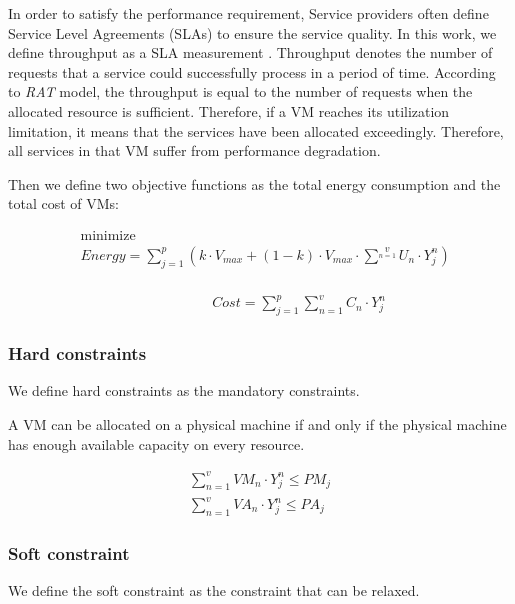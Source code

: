 In order to satisfy the performance requirement, Service providers often define Service Level Agreements (SLAs) to ensure the service quality. In this work, we define throughput as a SLA measurement \cite{SLA_metric}. 
Throughput denotes the number of requests that a service could successfully process in a period of time. According to \textit{RAT} model, the throughput is equal to the number of requests when the allocated resource is sufficient. 
Therefore, if a VM reaches its utilization limitation, it means that the services have been allocated exceedingly.
Therefore, all services in that VM suffer from 
performance degradation.


Then we define two objective functions as the total energy consumption and the total cost of VMs:

\begin{equation}
\label{eq:energy}
\begin{aligned}
& {\text{minimize}}\\
& Energy = \sum\limits_{j=1}^p (k \cdot V_{max} + (1 - k) \cdot V_{max} \cdot \sum^v\limits_{n=1} U_n \cdot Y^n_j)\\
\end{aligned}
\end{equation}

\begin{equation}
\label{eq:cost}
\begin{aligned}
& & & & & & & Cost = \sum\limits_{j=1}^p\sum\limits_{n=1}^v C_n \cdot Y^n_j
\end{aligned}
\end{equation}

\subsubsection{Hard constraints}
We define hard constraints as the mandatory constraints.

A VM can be allocated on a physical machine if and 
only if the physical machine has enough available capacity on every resource.

\begin{equation} 
\label{eq:constraint}
\begin{aligned}
\sum\limits_{n=1}^v VM_n \cdot Y^n_j \leq PM_j\\
\sum\limits_{n=1}^v VA_n \cdot Y^n_j \leq PA_j
\end{aligned}
\end{equation}

\subsubsection{Soft constraint}
We define the soft constraint as the constraint that can be relaxed. 

